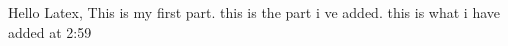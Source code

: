 \documentclass[a4paper]{article}
\begin{document}
Hello Latex, This is my first part.\newline
this is the part i ve added.
this is what i have added at 2:59



\end{document}
